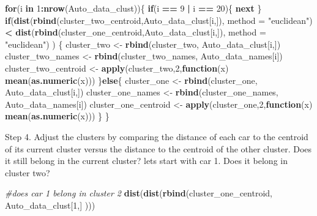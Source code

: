 \documentclass[11pt,]{article}
\newenvironment{Shaded}{\begin{snugshade}}{\end{snugshade}}
\newcommand{\CommentTok}[1]{\textcolor[rgb]{0.56,0.35,0.01}{\textit{#1}}}
\newcommand{\ControlFlowTok}[1]{\textcolor[rgb]{0.13,0.29,0.53}{\textbf{#1}}}
\newcommand{\DataTypeTok}[1]{\textcolor[rgb]{0.13,0.29,0.53}{#1}}
\newcommand{\DecValTok}[1]{\textcolor[rgb]{0.00,0.00,0.81}{#1}}
\newcommand{\KeywordTok}[1]{\textcolor[rgb]{0.13,0.29,0.53}{\textbf{#1}}}
\newcommand{\NormalTok}[1]{#1}
\newcommand{\OperatorTok}[1]{\textcolor[rgb]{0.81,0.36,0.00}{\textbf{#1}}}
\newcommand{\StringTok}[1]{\textcolor[rgb]{0.31,0.60,0.02}{#1}}
\begin{document}
\begin{Shaded}
\begin{Highlighting}[]
\ControlFlowTok{for}\NormalTok{(i }\ControlFlowTok{in} \DecValTok{1}\OperatorTok{:}\KeywordTok{nrow}\NormalTok{(Auto_data_clust))\{}
  \ControlFlowTok{if}\NormalTok{(i }\OperatorTok{==}\StringTok{ }\DecValTok{9} \OperatorTok{|}\StringTok{ }\NormalTok{i }\OperatorTok{==}\StringTok{ }\DecValTok{20}\NormalTok{)\{}
    \ControlFlowTok{next}
\NormalTok{  \}}
  \ControlFlowTok{if}\NormalTok{(}\KeywordTok{dist}\NormalTok{(}\KeywordTok{rbind}\NormalTok{(cluster_two_centroid,Auto_data_clust[i,]), }\DataTypeTok{method =} \StringTok{"euclidean"}\NormalTok{) }\OperatorTok{<}\StringTok{ }\KeywordTok{dist}\NormalTok{(}\KeywordTok{rbind}\NormalTok{(cluster_one_centroid,Auto_data_clust[i,]), }\DataTypeTok{method =} \StringTok{"euclidean"}\NormalTok{) ) \{}
\NormalTok{    cluster_two <-}\StringTok{ }\KeywordTok{rbind}\NormalTok{(cluster_two, Auto_data_clust[i,])}
\NormalTok{    cluster_two_names <-}\StringTok{ }\KeywordTok{rbind}\NormalTok{(cluster_two_names, Auto_data_names[i])}
\NormalTok{    cluster_two_centroid <-}\StringTok{ }\KeywordTok{apply}\NormalTok{(cluster_two,}\DecValTok{2}\NormalTok{,}\ControlFlowTok{function}\NormalTok{(x) }\KeywordTok{mean}\NormalTok{(}\KeywordTok{as.numeric}\NormalTok{(x)))}
\NormalTok{  \}}\ControlFlowTok{else}\NormalTok{\{}
\NormalTok{    cluster_one <-}\StringTok{ }\KeywordTok{rbind}\NormalTok{(cluster_one, Auto_data_clust[i,])}
\NormalTok{    cluster_one_names <-}\StringTok{ }\KeywordTok{rbind}\NormalTok{(cluster_one_names, Auto_data_names[i])}
\NormalTok{    cluster_one_centroid <-}\StringTok{ }\KeywordTok{apply}\NormalTok{(cluster_one,}\DecValTok{2}\NormalTok{,}\ControlFlowTok{function}\NormalTok{(x) }\KeywordTok{mean}\NormalTok{(}\KeywordTok{as.numeric}\NormalTok{(x)))}
\NormalTok{  \}}
\NormalTok{\}}
\end{Highlighting}
\end{Shaded}

Step 4. Adjust the clusters by comparing the distance of each car to the
centroid of its current cluster versus the distance to the centroid of
the other cluster. Does it still belong in the current cluster? lets
start with car 1. Does it belong in cluster two?

\begin{Shaded}
\begin{Highlighting}[]
\CommentTok{#does car 1 belong in cluster 2}
\KeywordTok{dist}\NormalTok{(}\KeywordTok{dist}\NormalTok{(}\KeywordTok{rbind}\NormalTok{(cluster_one_centroid, Auto_data_clust[}\DecValTok{1}\NormalTok{,] )))}
\end{Highlighting}
\end{Shaded}
\end{document}
